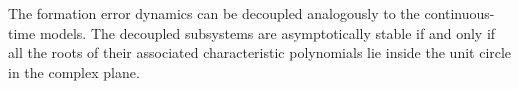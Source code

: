 
\label{sec:disc-time-stability-analysis}
The formation error dynamics can be decoupled analogously to the continuous-time models.
The decoupled subsystems are asymptotically stable
if and only if all the roots of their associated characteristic polynomials
lie inside the unit circle in the complex plane.

